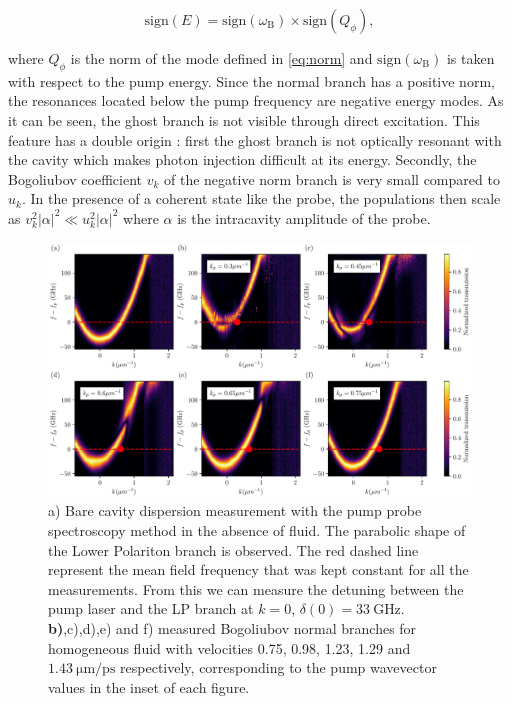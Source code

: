 \begin{equation}
    \mathrm{sign}(E)=\mathrm{sign}(\omega_\mathrm{B})\times \mathrm{sign}(Q_{\phi}),
 \end{equation}
 
where $Q_{\phi}$ is the norm of the mode defined in \autoref{eq:norm} and $\mathrm{sign}(\omega_\mathrm{B})$ is taken with respect to the pump energy. Since the normal branch has a positive norm, the resonances located
below the pump frequency are negative energy modes. As it can be seen, the ghost branch is not visible through direct excitation. This feature has a double origin : first the ghost branch is not optically resonant with the cavity which makes photon injection difficult at its energy. Secondly,
the Bogoliubov coefficient $v_k$ of the negative norm branch is very small compared to $u_k$.  In the presence of
a coherent state like the probe, the populations then scale as $v_k^2 |\alpha|^2\ll u_k^2|\alpha|^2$ where $\alpha$ is the intracavity amplitude of the probe. 

\begin{figure}[h!]
    \centering
    \includegraphics[width=1\textwidth]{chap_custom_st/fig/homogeneous_doppler.pdf}
    \caption{a) Bare cavity dispersion measurement with the pump probe spectroscopy method in the absence of fluid. 
    The parabolic shape of the Lower Polariton branch is observed.  
    The red dashed line represent the mean field frequency that was kept constant for all the measurements. 
    From this we can measure the detuning between the pump laser and the LP branch at $k=0$,
     $\delta(0) = \SI{33}{\giga\hertz}$. \textbf{b)},c),d),e) and f) measured Bogoliubov normal branches for homogeneous fluid with velocities 0.75, 0.98, 1.23, 1.29 and $\SI{1.43}{\micro \meter \per \pico \second}$ respectively, corresponding 
    to the pump wavevector values in the inset of each figure.}
     
    \label{fig:homogeneous_fluid_bogo}
\end{figure}

